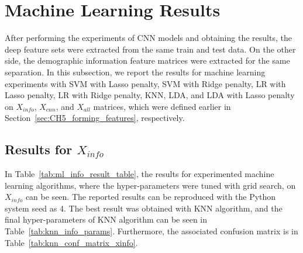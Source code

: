 \section{Machine Learning Results}



After performing the experiments of CNN models and obtaining the results, the deep feature sets were extracted from the same train and test data. On the other side, the demographic information feature matrices were extracted for the same separation. In this subsection, we report the results for machine learning experiments with SVM with Lasso penalty, SVM with Ridge penalty, LR with Lasso penalty, LR with Ridge penalty, KNN, LDA, and LDA with Lasso penalty on $X_{info}$, $X_{cnn}$, and $X_{all}$ matrices, which were defined earlier in Section~\ref{sec:CH5_forming_features}, respectively.

\subsection{Results for $X_{info}$} \label{CH6:results_xinfo}

In Table~\ref{tab:ml_info_result_table}, the results for experimented machine learning algorithms, where the hyper-parameters were tuned with grid search, on $X_{info}$ can be seen. The reported results can be reproduced with the Python system seed as 4. The best result was obtained with KNN algorithm, and the final hyper-parameters of KNN algorithm can be seen in Table~\ref{tab:knn_info_params}. Furthermore, the associated confusion matrix is in Table~\ref{tab:knn_conf_matrix_xinfo}.

